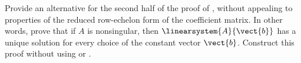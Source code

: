Provide an alternative for the second half of the proof of , without appealing to properties of the reduced row-echelon form of the coefficient matrix.  In other words, prove that if $A$ is nonsingular, then $\linearsystem{A}{\vect{b}}$ has a unique solution for every choice of the constant vector $\vect{b}$.  Construct this proof without using  or .